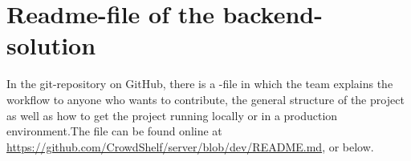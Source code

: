 \chapter{Readme-file of the backend-solution}
\label{app:backend-readme}
In the git-repository on GitHub, there is a -file in which the team explains the workflow to anyone who wants to contribute, the general structure of the project as well as how to get the project running locally or in a production environment.The file can be found online at \url{https://github.com/CrowdShelf/server/blob/dev/README.md}, or below.


%



